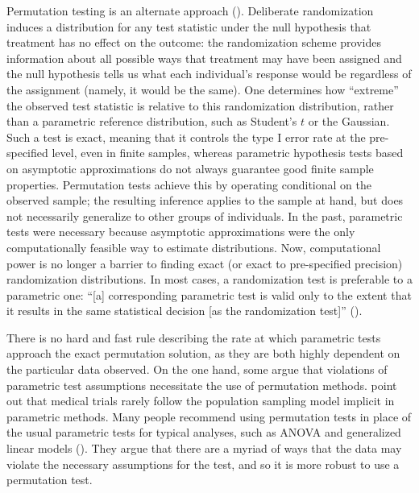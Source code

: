 \documentclass[11pt]{article}
\begin{document}
Permutation testing is an alternate approach (\cite{fisher_design_1935, pitman_significance_1937,pitman_significance_1938}).
Deliberate randomization induces a distribution for any test statistic under the null hypothesis that treatment has no effect on the outcome:
the randomization scheme provides information about all possible ways that treatment may have been assigned 
and the null hypothesis tells us what each individual's response would be regardless of the assignment (namely, it would be the same).
One determines how ``extreme'' the observed test statistic is relative to this randomization distribution, rather than a parametric reference distribution, such as Student's $t$ or the Gaussian.
Such a test is exact, meaning that it controls the type I error rate at the pre-specified level, even in finite samples, whereas parametric hypothesis tests based on asymptotic approximations do not always guarantee good finite sample properties.
Permutation tests achieve this by operating conditional on the observed sample; the resulting inference applies to the sample at hand, but does not necessarily generalize to other groups of individuals.
In the past, parametric tests were necessary because asymptotic approximations were the only computationally feasible way to estimate distributions. 
Now, computational power is no longer a barrier to finding exact (or exact to pre-specified precision) randomization distributions.
In most cases, a randomization test is preferable to a parametric one:
``[a] corresponding parametric test is valid only to the extent that it results in the same statistical decision [as the randomization test]'' (\cite{bradley_distribution_1968}).

There is no hard and fast rule describing the rate at which parametric tests approach the exact permutation solution, as they are both highly dependent on the particular data observed.
On the one hand, some argue that violations of parametric test assumptions necessitate the use of permutation methods.
\cite{ludbrook_why_1998} point out that medical trials rarely follow the population sampling model implicit in parametric methods.
Many people recommend using permutation tests in place of the usual parametric tests for typical analyses, such as ANOVA and generalized linear models (\cite{still_approximate_1981, winkler_permutation_2014}).
They argue that there are a myriad of ways that the data may violate the necessary assumptions for the test, and so it is more robust to use a permutation test.
\end{document}
